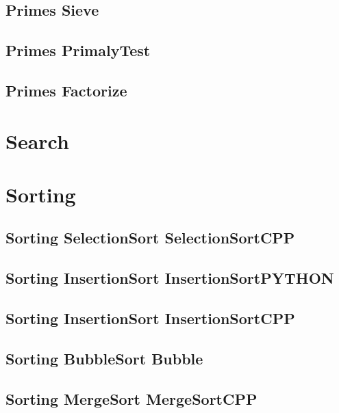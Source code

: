 \subsection{Primes Sieve}
\raggedbottom
\hrulefill
\subsection{Primes PrimalyTest}
\raggedbottom
\hrulefill
\subsection{Primes Factorize}
\raggedbottom
\hrulefill

\section{Search}

\section{Sorting}
\subsection{Sorting SelectionSort SelectionSortCPP}
\raggedbottom
\hrulefill
\subsection{Sorting InsertionSort InsertionSortPYTHON}
\raggedbottom
\hrulefill
\subsection{Sorting InsertionSort InsertionSortCPP}
\raggedbottom
\hrulefill
\subsection{Sorting BubbleSort Bubble}
\raggedbottom
\hrulefill
\subsection{Sorting MergeSort MergeSortCPP}
\raggedbottom
\hrulefill
